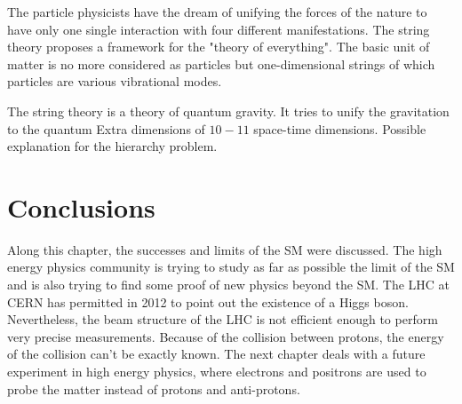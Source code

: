       The particle physicists have the dream of unifying the forces of the nature to have only one single interaction with four different manifestations.
      The string theory proposes a framework for the "theory of everything".
      The basic unit of matter is no more considered as particles but one-dimensional strings of which particles are various vibrational modes.

      The string theory is a theory of quantum gravity.
      It tries to unify the gravitation to the quantum 
      Extra dimensions of $10-11$ space-time dimensions.
      Possible explanation for the hierarchy problem.

  \section{Conclusions}

  Along this chapter, the successes and limits of the \gls{SM} were discussed.
  The high energy physics community is trying to study as far as possible the limit of the \gls{SM} and is also trying to find some proof of new physics beyond the \gls{SM}.
  The \gls{LHC} at CERN has permitted in 2012 to point out the existence of a Higgs boson.  
  Nevertheless, the beam structure of the LHC is not efficient enough to perform very precise measurements.
  Because of the collision between protons, the energy of the collision can't be exactly known.
  The next chapter deals with a future experiment in high energy physics, where electrons and positrons are used to probe the matter instead of protons and anti-protons.

